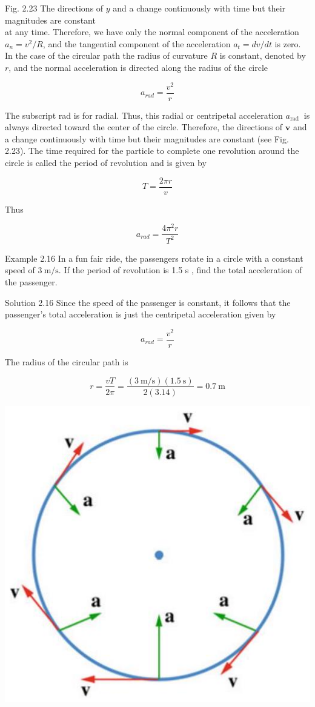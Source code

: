 \documentclass[10pt]{article}
\begin{document}
Fig. 2.23 The directions of $y$ and a change continuously with time but their magnitudes are constant\\
at any time. Therefore, we have only the normal component of the acceleration $a_{n}=v^{2} / R$, and the tangential component of the acceleration $a_{t}=d v / d t$ is zero. In the case of the circular path the radius of curvature $R$ is constant, denoted by $r$, and the normal acceleration is directed along the radius of the circle

$$
a_{r a d}=\frac{v^{2}}{r}
$$

The subscript rad is for radial. Thus, this radial or centripetal acceleration $a_{\text {rad }}$ is always directed toward the center of the circle. Therefore, the directions of $\mathbf{v}$ and a change continuously with time but their magnitudes are constant (see Fig. 2.23). The time required for the particle to complete one revolution around the circle is called the period of revolution and is given by

$$
T=\frac{2 \pi r}{v}
$$

Thus

$$
a_{r a d}=\frac{4 \pi^{2} r}{T^{2}}
$$

Example 2.16 In a fun fair ride, the passengers rotate in a circle with a constant speed of $3 \mathrm{~m} / \mathrm{s}$. If the period of revolution is 1.5 s , find the total acceleration of the passenger.

Solution 2.16 Since the speed of the passenger is constant, it follows that the passenger's total acceleration is just the centripetal acceleration given by

$$
a_{r a d}=\frac{v^{2}}{r}
$$

The radius of the circular path is

$$
r=\frac{v T}{2 \pi}=\frac{(3 \mathrm{~m} / \mathrm{s})(1.5 \mathrm{~s})}{2(3.14)}=0.7 \mathrm{~m}
$$

\begin{center}
\includegraphics[max width=\textwidth]{2024_09_13_db1f357d2aad0a03eb2eg-040}
\end{center}
\end{document}
